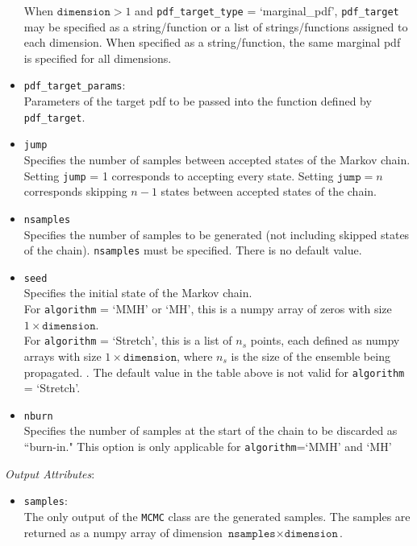 \begin{itemize}
	When $\texttt{dimension}>1$ and \texttt{pdf\_target\_type} = `marginal\_pdf', \texttt{pdf\_target} may be specified as a string/function or a list of strings/functions assigned to each 		dimension. When specified as a string/function, the same marginal pdf is specified for all dimensions.
\item \texttt{pdf\_target\_params}:\\
	Parameters of the target pdf to be passed into the function defined by \texttt{pdf\_target}.
\item \texttt{jump}\\
	Specifies the number of samples between accepted states of the Markov chain. Setting \texttt{jump} = 1 corresponds to accepting every state. Setting $\texttt{jump} = n$ corresponds 	skipping $n-1$ states between accepted states of the chain.
\item \texttt{nsamples}\\
	Specifies the number of samples to be generated (not including skipped states of the chain). \texttt{nsamples} must be specified. There is no default value.
\item \texttt{seed}\\
	Specifies the initial state of the Markov chain. \\
	
	For \texttt{algorithm} = `MMH' or `MH', this is a numpy array of zeros with size $1\times \texttt{dimension}$.\\
	
	For \texttt{algorithm} = `Stretch', this is a list of $n_s$ points, each defined as numpy arrays with size $1\times \texttt{dimension}$, where $n_s$ is the size of the ensemble being 		propagated. \cite{Goodman2010}. The default value in the table above is not valid for  \texttt{algorithm} = `Stretch'.
\item \texttt{nburn}\\
	Specifies the number of samples at the start of the chain to be discarded as ``burn-in." This option is only applicable for \texttt{algorithm}=`MMH' and `MH'
\end{itemize}

\noindent\textit{Output Attributes}:
\begin{itemize}
\item \texttt{samples}:\\
	The only output of the \texttt{MCMC} class are the generated samples. The samples are returned as a numpy array of dimension $\texttt{nsamples}\times\texttt{dimension}$. 
\end{itemize}

